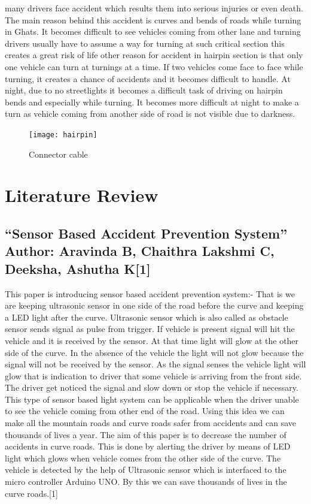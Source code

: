 \documentclass[conference]{IEEEtran}
\begin{document}
    many drivers face accident which results them into serious injuries or even death. The main reason behind
    this accident is curves and bends of roads while turning in Ghats. It becomes difficult to see vehicles coming
    from other lane and turning drivers usually have to assume a way for turning at such critical section this
    creates a great risk of life other reason for accident in hairpin section is that only one vehicle can turn at
    turnings at a time. If two vehicles come face to face while turning, it creates a chance of accidents and it
    becomes difficult to handle. At night, due to no streetlights it becomes a difficult task of driving on hairpin
    bends and especially while turning. It becomes more difficult at night to make a turn as vehicle coming from
    another side of road is not visible due to darkness.
    \begin{figure}[htbp]
        \centerline{\texttt{[image: hairpin]}}
        \caption{Connector cable}
        \label{fig}
    \end{figure}

    \section{Literature Review}

    \subsection{“Sensor Based Accident Prevention System” Author: Aravinda B, Chaithra Lakshmi C, Deeksha, Ashutha K[1]}

    This paper is introducing sensor based accident prevention system:- That is we are keeping ultrasonic sensor in one side of the road
    before the curve and keeping a LED light after the curve. Ultrasonic sensor which is also called as obstacle sensor sends signal as
    pulse from trigger. If vehicle is present signal will hit the vehicle and it is received by the sensor. At that time light will glow at the
    other side of the curve. In the absence of the vehicle the light will not glow because the signal will not be received by the sensor. As
    the signal senses the vehicle light will glow that is indication to driver that some vehicle is arriving from the front side. The driver
    get noticed the signal and slow down or stop the vehicle if necessary. This type of sensor based light system can be applicable when
    the driver unable to see the vehicle coming from other end of the road. Using this idea we can make all the mountain roads and
    curve roads safer from accidents and can save thousands of lives a year. The aim of this paper is to decrease the number of accidents
    in curve roads. This is done by alerting the driver by means of LED light which glows when vehicle comes from the other side of
    the curve. The vehicle is detected by the help of Ultrasonic sensor which is interfaced to the micro controller Arduino UNO. By this
    we can save thousands of lives in the curve roads.[1]
    
\end{document}
